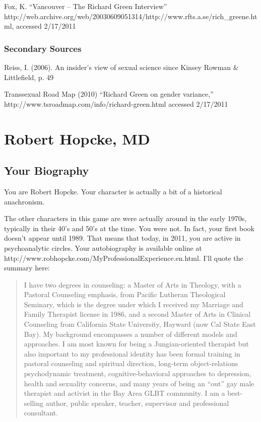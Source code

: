 \begin{refsection}
Fox, K. ``Vancouver – The Richard Green Interview'' http:\slash \slash web.archive.org\slash web\slash 20030609051314\slash http:\slash \slash www.rfts.a.se\slash rich\_greene.html, accessed 2\slash 17\slash 2011

\subsection{Secondary Sources}
\label{secondarysources}

Reiss, I. (2006). An insider's view of sexual science since Kinsey Rowman \& Littlefield, p. 49

Transsexual Road Map (2010) ``Richard Green on gender variance,'' http:\slash \slash www.tsroadmap.com\slash info\slash richard-green.html accessed 2\slash 17\slash 2011

\chapter{Robert Hopcke, MD}
\label{roberthopckemd}

\section{Your Biography}
\label{yourbiography}

You are Robert Hopcke. Your character is actually a bit of a historical anachronism. 

The other characters in this game are were actually around in the early 1970s, typically in their 40's and 50's at the time. You were not. In fact, your first book doesn't appear until 1989. That means that today, in 2011, you are active in psychoanalytic circles. Your autobiography is available online at http:\slash \slash www.robhopcke.com\slash MyProfessionalExperience.en.html. I'll quote the summary here:

\begin{quote}

I have two degrees in counseling: a Master of Arts in Theology, with a Pastoral Counseling emphasis, from Pacific Lutheran Theological Seminary, which is the degree under which I received my Marriage and Family Therapist license in 1986, and a second Master of Arts in Clinical Counseling from California State University, Hayward (now Cal State East Bay). My background encompasses a number of different models and approaches. I am most known for being a Jungian-oriented therapist but also important to my professional identity has been formal training in pastoral counseling and spiritual direction, long-term object-relations psychodynamic treatment, cognitive-behavioral approaches to depression, health and sexuality concerns, and many years of being an ``out'' gay male therapist and activist in the Bay Area GLBT community. I am a best-selling author, public speaker, teacher, supervisor and professional consultant.
\end{quote}


\end{refsection}
